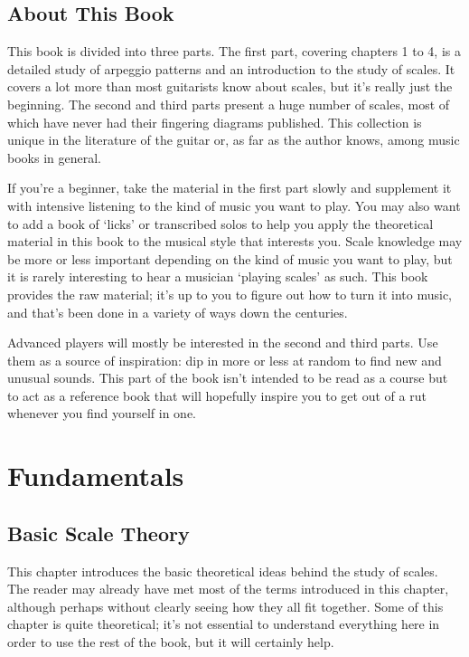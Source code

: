 \documentclass[english]{./gbook}
\begin{document}
\pagestyle{headings}

\tableofcontents
\mainmatter

\begin{large}

\chapter*{About This Book}

This book is divided into three parts. The first part, covering chapters 1 to 4, is a detailed study of arpeggio patterns and an introduction to the study of scales. It covers a lot more than most guitarists know about scales, but it's really just the beginning. The second and third parts present a huge number of scales, most of which have never had their fingering diagrams published. This collection is unique in the literature of the guitar or, as far as the author knows, among music books in general.

If you're a beginner, take the material in the first part slowly and supplement it with intensive listening to the kind of music you want to play. You may also want to add a book of `licks' or transcribed solos to help you apply the theoretical material in this book to the musical style that interests you. Scale knowledge may be more or less important depending on the kind of music you want to play, but it is rarely interesting to hear a musician `playing scales' as such. This book provides the raw material; it's up to you to figure out how to turn it into music, and that's been done in a variety of ways down the centuries.

Advanced players will mostly be interested in the second and third parts. Use them as a source of inspiration: dip in more or less at random to find new and unusual sounds. This part of the book isn't intended to be read as a course but to act as a reference book that will hopefully inspire you to get out of a rut whenever you find yourself in one.

\part{Fundamentals}

\chapter{\mbox{Basic} \mbox{Scale} \mbox{Theory}}

This chapter introduces the basic theoretical ideas behind the study of scales. The reader may already have met most of the terms introduced in this chapter, although perhaps without clearly seeing how they all fit together. Some of this chapter is quite theoretical; it's not essential to understand everything here in order to use the rest of the book, but it will certainly help.


\end{large}
\end{document}
